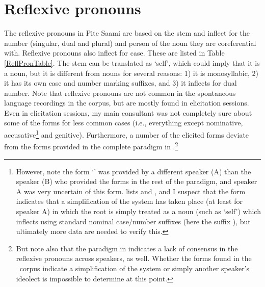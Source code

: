 
\FB



\section{Reflexive pronouns}\label{reflexivePronouns}
The reflexive pronouns in Pite Saami are based on the stem  and inflect for the number (singular, dual and plural) and person of the noun they are coreferential with. Reflexive pronouns also inflect for case. These are listed in Table \vref{ReflPronTable}. 
The stem  can be translated as ‘self’, which could imply that it is a noun, but it is different from nouns for several reasons: 1) it is monosyllabic, 2) it has its own case and number marking suffixes, and 3) it inflects for dual number. %
Note that reflexive pronouns are not common in the spontaneous language recordings in the corpus, but are mostly found in elicitation sessions. Even in elicitation sessions, my main consultant was not completely sure about some of the forms for less common cases (i.e., everything except nominative, accusative\footnote{However, note the form  ‘’ was provided by a different speaker (A) than the speaker (B) who provided the forms in the rest of the paradigm, and speaker A was very uncertain of this form. \citet[162]{Lehtiranta1992} lists  and , and I suspect that the form  indicates that a simplification of the system has taken place (at least for speaker A) in which the root  is simply treated as a noun (such as ‘self’) which inflects using standard nominal case/number suffixes (here the  suffix ), but ultimately more data are needed to verify this.} 
and genitive). Furthermore, a number of the elicited forms deviate from the forms provided in the complete paradigm in \citet[162]{Lehtiranta1992}.\footnote{But note also that the paradigm in \citet[162]{Lehtiranta1992} indicates a lack of consensus in the reflexive pronouns across speakers, as well. Whether the forms found in the \PSDP\ corpus indicate a simplification of the system or simply another speaker’s ideolect is impossible to determine at this point.}

